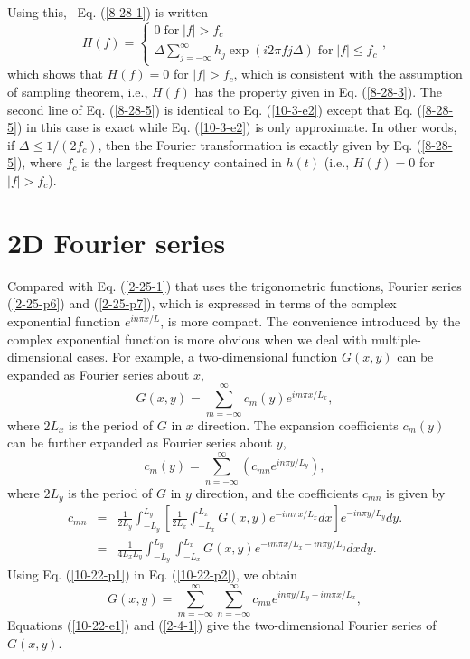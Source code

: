 \documentclass{article}
\newcommand{\tmop}[1]{\ensuremath{\operatorname{#1}}}
\begin{document}
Using this, \ Eq. (\ref{8-28-1}) is written
\begin{equation}
  \label{8-28-5} H (f) = \left\{ \begin{array}{l}
    0 \tmop{for} |f| > f_c\\
    \Delta \sum_{j = - \infty}^{\infty} h_j \exp (i 2 \pi f j \Delta)
    \tmop{for} |f| \leqslant f_c
  \end{array}, \right.
\end{equation}
which shows that $H (f) = 0$ for $|f| > f_c$, which is consistent with the
assumption of sampling theorem, i.e., $H (f)$ has the property given in Eq.
(\ref{8-28-3}). The second line of Eq. (\ref{8-28-5}) is identical to Eq.
(\ref{10-3-e2}) except that Eq. (\ref{8-28-5}) in this case is exact while Eq.
(\ref{10-3-e2}) is only approximate. In other words, if $\Delta \leqslant 1 /
(2 f_c)$, then the Fourier transformation is exactly given by Eq.
(\ref{8-28-5}), where $f_c$ is the largest frequency contained in $h (t)$
(i.e., $H (f) = 0$ for $|f| > f_c$).

\section{2D Fourier series}

Compared with Eq. (\ref{2-25-1}) that uses the trigonometric functions,
Fourier series (\ref{2-25-p6}) and (\ref{2-25-p7}), which is expressed in
terms of the complex exponential function $e^{i n \pi x / L}$, is more
compact. The convenience introduced by the complex exponential function is
more obvious when we deal with multiple-dimensional cases. For example, a
two-dimensional function $G (x, y)$ can be expanded as Fourier series about
$x$,
\begin{equation}
  \label{10-22-p2} G (x, y) = \sum_{m = - \infty}^{\infty} c_m (y) e^{i m \pi
  x / L_x},
\end{equation}
where $2 L_x$ is the period of $G$ in $x$ direction. The expansion
coefficients $c_m (y)$ can be further expanded as Fourier series about $y$,
\begin{equation}
  \label{10-22-p1} c_m (y) = \sum_{n = - \infty}^{\infty} (c_{m n} e^{i n \pi
  y / L_y}),
\end{equation}
where $2 L_y$ is the period of $G$ in $y$ direction, and the coefficients
$c_{m n}$ is given by
\begin{eqnarray}
  c_{m n} & = & \frac{1}{2 L_y} \int_{- L_y}^{L_y} \left[ \frac{1}{2 L_x}
  \int_{- L_x}^{L_x} G (x, y) e^{- i m \pi x / L_x} d x \right] e^{- i n \pi y
  / L_y} d y. \nonumber\\
  & = & \frac{1}{4 L_x L_y} \int_{- L_y}^{L_y} \int_{- L_x}^{L_x} G (x, y)
  {e^{- i m \pi x / L_x - i n \pi y / L_y}}  d x d y.  \label{2-4-1}
\end{eqnarray}
Using Eq. (\ref{10-22-p1}) in Eq. (\ref{10-22-p2}), we obtain
\begin{equation}
  \label{10-22-e1} G (x, y) = \sum_{m = - \infty}^{\infty} \sum_{n = -
  \infty}^{\infty} c_{m n} e^{i n \pi y / L_y + i m \pi x / L_x},
\end{equation}
Equations (\ref{10-22-e1}) and (\ref{2-4-1}) give the two-dimensional Fourier
series of $G (x, y)$.
\end{document}
